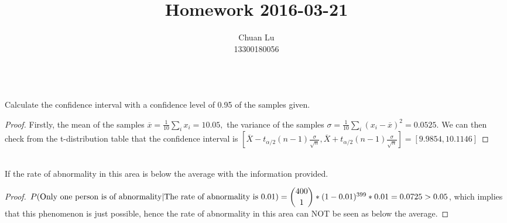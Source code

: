 \documentclass{article}
\newenvironment{problem}[2][Problem]{\begin{trivlist}
\item[\hskip \labelsep {\bfseries #1}\hskip \labelsep {\bfseries #2.}]}{\end{trivlist}}
\begin{document}
\title{Homework 2016-03-21}
\author{Chuan Lu\\
13300180056}

\maketitle

\begin{problem}{1}
\text{ }\\
Calculate the confidence interval with a confidence level of 0.95 of the samples given.
\end{problem}
\begin{proof}
Firstly, the mean of the samples $\overline{x} = \frac{1}{10}\sum_{i}{x_{i}} = 10.05,$ the variance of the samples $\sigma = \frac{1}{10}\sum_{i}{(x_{i} - \overline{x})^{2}} = 0.0525.$ We can then check from the t-distribution table that the confidence interval is $[\overline{X} - t_{\alpha/2}(n-1)\frac{\sigma}{\sqrt{n}}, \overline{X} + t_{\alpha/2}(n-1)\frac{\sigma}{\sqrt{n}}] = [9.9854, 10.1146]$
\end{proof}


\begin{problem}{2}
\text{ }\\
If the rate of abnormality in this area is below the average with the information provided.
\end{problem}
\begin{proof}
$P(\mbox{Only one person is of abnormality}\vert\mbox{The rate of abnormality is 0.01}) =  \dbinom{400}{1}*(1-0.01)^{399}*0.01 = 0.0725 > 0.05$, which implies that this phenomenon is just possible, hence the rate of abnormality in this area can NOT be seen as below the average.
\end{proof}
\end{document}
